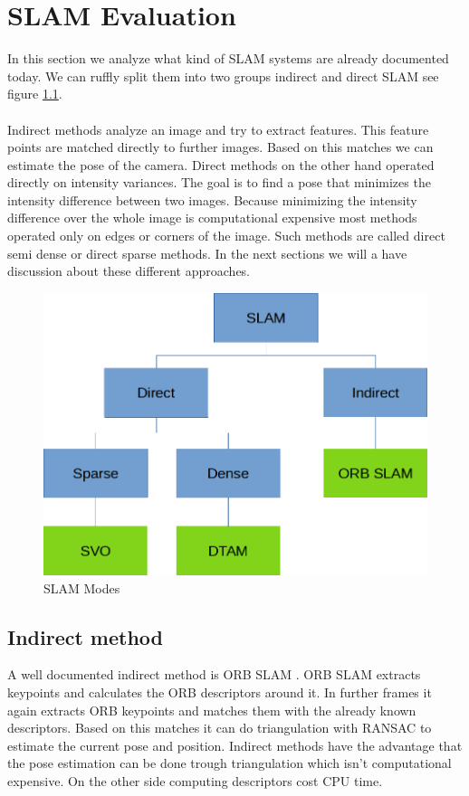 \documentclass[11pt,a4paper,titlepage,oneside]{report}
\begin{document}
\chapter{SLAM Evaluation}

In this section we analyze what kind of SLAM systems are already documented today. We can ruffly split them into two groups indirect and direct SLAM see figure \ref{fig:slammodes}.\\\\
Indirect methods analyze an image and try to extract features. This feature points are matched directly to further images. Based on this matches we can estimate the pose of the camera.
Direct methods on the other hand operated directly on intensity variances. The goal is to find a pose that minimizes the intensity difference between two images. Because minimizing the intensity difference over the whole image is computational expensive most methods operated only on edges or corners of the image. Such methods are called direct semi dense or direct sparse methods. In the next sections we will a have discussion about these different approaches.

\begin{figure}[H]
	\includegraphics[width=1.0\textwidth]{img/slam_modes.png}
	\caption{SLAM Modes}\label{fig:slammodes}
\end{figure}


\section{Indirect method}

A well documented indirect method is ORB SLAM \cite{orbslam}. ORB SLAM extracts keypoints and calculates the ORB descriptors \cite{orb} around it. In further frames it again extracts ORB keypoints and matches them with the already known descriptors. Based on this matches it can do triangulation with RANSAC \cite{ransac} to estimate the current pose and position. Indirect methods have the advantage that the pose estimation can be done trough triangulation which isn't computational expensive. On the other side computing descriptors cost CPU time.
\end{document}
